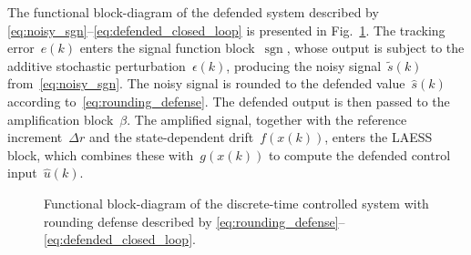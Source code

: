 \par
The functional block-diagram of the defended system described by
\eqref{eq:noisy_sgn}--\eqref{eq:defended_closed_loop} is presented
in Fig.~\ref{fig:defended-system}. The tracking error~$e(k)$ enters
the signal function block~$\operatorname{sgn}$, whose output is
subject to the additive stochastic perturbation~$\epsilon(k)$,
producing the noisy signal~$\widetilde{s}(k)$
from~\eqref{eq:noisy_sgn}. The noisy signal is rounded to the
defended value~$\hat{s}(k)$ according
to~\eqref{eq:rounding_defense}. The defended output is then passed
to the amplification block~$\beta$. The amplified signal, together
with the reference increment~$\Delta r$ and the state-dependent
drift~$f(x(k))$, enters the LAESS block, which combines these
with~$g(x(k))$ to compute the defended control
input~$\hat{u}(k)$.
\begin{figure}[H]
	\centering
	
	\caption{Functional block-diagram of the discrete-time controlled
		system with rounding defense described by
		\eqref{eq:rounding_defense}--\eqref{eq:defended_closed_loop}.}
	\label{fig:defended-system}
\end{figure}
